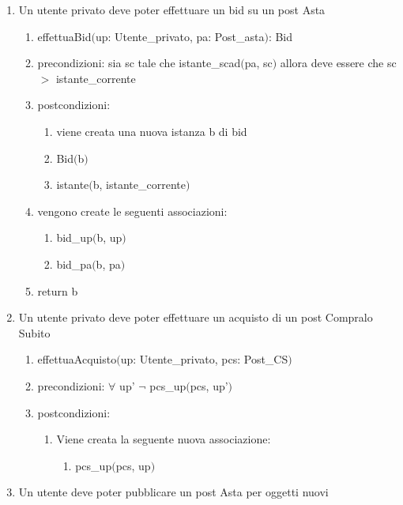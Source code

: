\documentclass{article}
\begin{document}
\begin{enumerate}
    \item Un utente privato deve poter effettuare un bid su un post Asta
    \begin{enumerate}
        \item effettuaBid$($up: Utente\_privato, pa: Post\_asta$)$: Bid
        \item precondizioni: sia sc tale che istante\_scad$($pa, sc$)$ allora deve essere che sc $>$ istante\_corrente
        \item postcondizioni: 
        \begin{enumerate}
            \item viene creata una nuova istanza b di bid
            \item Bid$($b$)$
            \item istante$($b, istante\_corrente$)$
        \end{enumerate}
        \item vengono create le seguenti associazioni:
        \begin{enumerate}
            \item bid\_up$($b, up$)$
            \item bid\_pa$($b, pa$)$
        \end{enumerate}
        \item return b
    \end{enumerate}
    \item Un utente privato deve poter effettuare un acquisto di un post Compralo Subito
    \begin{enumerate}
        \item effettuaAcquisto$($up: Utente\_privato, pcs: Post\_CS$)$
        \item precondizioni: $\forall$ up' $\neg$ pcs\_up$($pcs, up'$)$
        \item postcondizioni:
        \begin{enumerate}
            \item Viene creata la seguente nuova associazione:
            \begin{enumerate}
                \item pcs\_up$($pcs, up$)$
            \end{enumerate}
        \end{enumerate}
    \end{enumerate}
    \item Un utente deve poter pubblicare un post Asta per oggetti nuovi
    \begin{enumerate}

\end{enumerate}
\end{enumerate}
\end{document}
